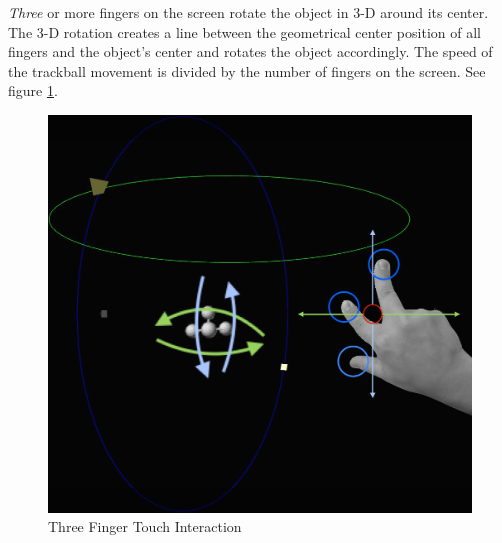 \documentclass[12pt]{extarticle}
\begin{document}
\begin{appendices}
\emph{Three} or more fingers on the screen rotate the object in 3-D around its center. The 3-D rotation creates a line between the geometrical center position of all fingers and the object\rq{}s center and rotates the object accordingly. The speed of the trackball movement is divided by the number of fingers on the screen.
See figure \ref{fig: AT3F}.
\begin{center}
\begin{figure}[!h]
\includegraphics[scale=0.4]{Images/Touch3Fingers.png}
\caption{Three Finger Touch Interaction}
\label{fig: AT3F}
\end{figure}
\end{center}

\end{appendices}
\end{document}
